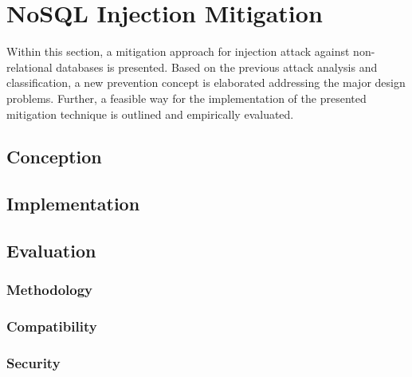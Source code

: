\chapter{NoSQL Injection Mitigation}
Within this section, a mitigation approach for injection attack against non-relational databases is presented. Based on the previous attack analysis and classification, a new prevention concept is elaborated addressing the major design problems. Further, a feasible way for the implementation of the presented mitigation technique is outlined and empirically evaluated.

\section{Conception}



\section{Implementation}



\section{Evaluation}
\label{sec:evaluation}

\subsection{Methodology}

\subsection{Compatibility}

\subsection{Security}
